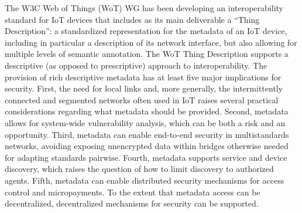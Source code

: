 The W3C Web of Things (WoT) WG has been developing an interoperability standard for IoT devices that includes as
its main deliverable a ``Thing Description'': a standardized representation for the metadata of an 
IoT device, including in particular a description of its network interface,
but also allowing for multiple levels of semantic annotation.
The WoT Thing Description supports a descriptive (as opposed to prescriptive) approach to interoperability.
The provision of rich descriptive metadata has at least five major implications for security.
First, the need for local links and, more generally,
       the intermittently connected and segmented networks often used
       in IoT raises several practical considerations regarding what metadata should be provided.
Second, metadata allows for system-wide vulnerability analysis, 
       which can be both a risk and an opportunity.
Third, metadata can enable end-to-end security in multistandards networks,
       avoiding exposing unencrypted data within bridges otherwise needed for adapting standards pairwise.
Fourth, metadata supports service and device discovery,
       which raises the question of how to limit discovery to authorized agents.
Fifth, metadata can enable distributed security mechanisms for access control and micropayments.
       To the extent that metadata access can be decentralized, decentralized mechanisms for security can
       be supported.
